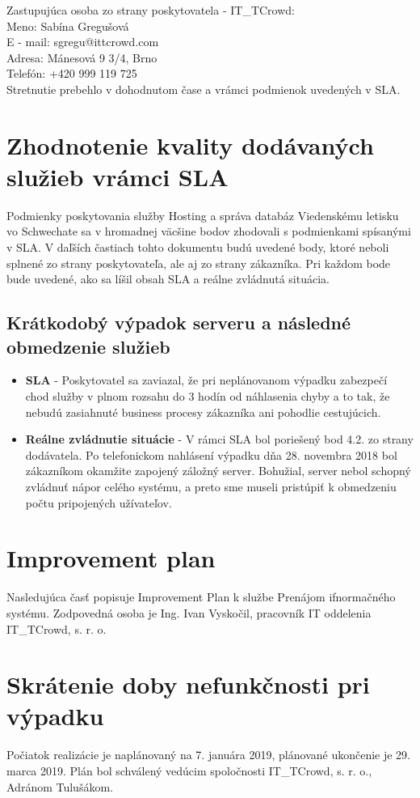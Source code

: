 \documentclass[a4paper, 11pt]{article}
\begin{document}
Zastupujúca osoba zo strany poskytovatela - IT\_TCrowd:\\
Meno: Sabína Gregušová\\
E - mail: sgregu@ittcrowd.com\\
Adresa: Mánesová 9 3/4, Brno\\
Telefón: +420 999 119 725\\

Stretnutie prebehlo v dohodnutom čase a vrámci podmienok uvedených v SLA.

\section*{Zhodnotenie kvality dodávaných služieb vrámci SLA}
Podmienky poskytovania služby Hosting a správa databáz Viedenskému letisku vo Schwechate sa v hromadnej väcšine bodov zhodovali s podmienkami spísanými v SLA. V daľších častiach tohto dokumentu budú uvedené body, ktoré neboli splnené zo strany poskytovateľa, ale aj zo strany zákazníka. Pri každom bode bude uvedené, ako sa líšil obsah SLA a reálne zvládnutá situácia.

\subsection*{Krátkodobý výpadok serveru a následné obmedzenie služieb}
\begin{itemize}
\item \textbf{SLA} - Poskytovatel sa zaviazal, že pri neplánovanom výpadku zabezpečí chod služby v plnom rozsahu do 3 hodín od náhlasenia chyby a to tak, že nebudú zasiahnuté business procesy zákazníka ani pohodlie cestujúcich.
\item \textbf{Reálne zvládnutie situácie} - V rámci SLA bol poriešený bod 4.2. zo strany dodávatela. Po telefonickom nahlásení výpadku dňa 28. novembra 2018 bol zákazníkom okamžite zapojený záložný server. Bohužial, server nebol schopný zvládnuť nápor celého systému, a preto sme museli pristúpiť k obmedzeniu počtu pripojených užívateľov.
\end{itemize}

\section*{Improvement plan}
Nasledujúca časť popisuje Improvement Plan k službe Prenájom ifnormačného systému. Zodpovedná osoba je Ing. Ivan Vyskočil, pracovník IT oddelenia IT\_TCrowd, s. r. o.

\section*{Skrátenie doby nefunkčnosti pri výpadku}
Počiatok realizácie je naplánovaný na 7. januára 2019, plánované ukončenie je 29. marca 2019. Plán bol schválený vedúcim spoločnosti IT\_TCrowd, s. r. o., Adránom Tulušákom.
\end{document}
